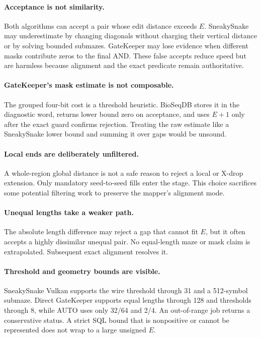 \paragraph{Acceptance is not similarity.}
Both algorithms can accept a pair whose edit distance exceeds \(E\).
SneakySnake may underestimate by changing diagonals without charging their
vertical distance or by solving bounded submazes.  GateKeeper may lose evidence
when different masks contribute zeros to the final AND.  These false accepts
reduce speed but are harmless because alignment and the exact predicate remain
authoritative.

\paragraph{GateKeeper's mask estimate is not composable.}
The grouped four-bit cost is a threshold heuristic.  BioSeqDB stores it in the
diagnostic word, returns lower bound zero on acceptance, and uses \(E+1\) only
after the exact guard confirms rejection.  Treating the raw estimate like a
SneakySnake lower bound and summing it over gaps would be unsound.

\paragraph{Local ends are deliberately unfiltered.}
A whole-region global distance is not a safe reason to reject a local or
X-drop extension.  Only mandatory seed-to-seed fills enter the stage.  This
choice sacrifices some potential filtering work to preserve the mapper's
alignment mode.

\paragraph{Unequal lengths take a weaker path.}
The absolute length difference may reject a gap that cannot fit \(E\), but it
often accepts a highly dissimilar unequal pair.  No equal-length maze or mask
claim is extrapolated.  Subsequent exact alignment resolves it.

\paragraph{Threshold and geometry bounds are visible.}
SneakySnake Vulkan supports the wire threshold through 31 and a 512-symbol
submaze.  Direct GateKeeper supports equal lengths through 128 and thresholds
through 8, while AUTO uses only 32/64 and 2/4.  An out-of-range job returns a
conservative status.  A strict SQL bound that is nonpositive or cannot be
represented does not wrap to a large unsigned \(E\).

